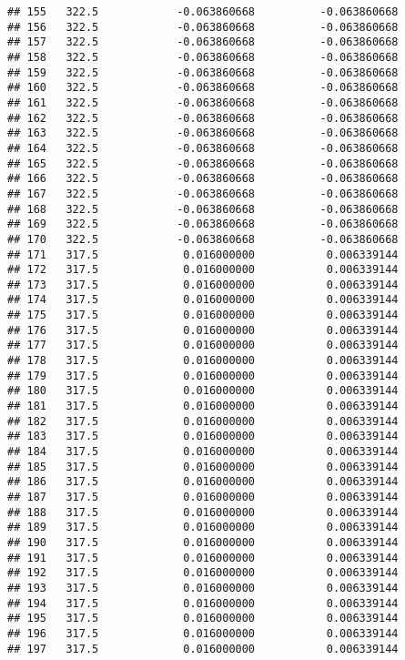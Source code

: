 \documentclass[]{article}
\begin{document}
\begin{verbatim}
## 155   322.5            -0.063860668          -0.063860668
## 156   322.5            -0.063860668          -0.063860668
## 157   322.5            -0.063860668          -0.063860668
## 158   322.5            -0.063860668          -0.063860668
## 159   322.5            -0.063860668          -0.063860668
## 160   322.5            -0.063860668          -0.063860668
## 161   322.5            -0.063860668          -0.063860668
## 162   322.5            -0.063860668          -0.063860668
## 163   322.5            -0.063860668          -0.063860668
## 164   322.5            -0.063860668          -0.063860668
## 165   322.5            -0.063860668          -0.063860668
## 166   322.5            -0.063860668          -0.063860668
## 167   322.5            -0.063860668          -0.063860668
## 168   322.5            -0.063860668          -0.063860668
## 169   322.5            -0.063860668          -0.063860668
## 170   322.5            -0.063860668          -0.063860668
## 171   317.5             0.016000000           0.006339144
## 172   317.5             0.016000000           0.006339144
## 173   317.5             0.016000000           0.006339144
## 174   317.5             0.016000000           0.006339144
## 175   317.5             0.016000000           0.006339144
## 176   317.5             0.016000000           0.006339144
## 177   317.5             0.016000000           0.006339144
## 178   317.5             0.016000000           0.006339144
## 179   317.5             0.016000000           0.006339144
## 180   317.5             0.016000000           0.006339144
## 181   317.5             0.016000000           0.006339144
## 182   317.5             0.016000000           0.006339144
## 183   317.5             0.016000000           0.006339144
## 184   317.5             0.016000000           0.006339144
## 185   317.5             0.016000000           0.006339144
## 186   317.5             0.016000000           0.006339144
## 187   317.5             0.016000000           0.006339144
## 188   317.5             0.016000000           0.006339144
## 189   317.5             0.016000000           0.006339144
## 190   317.5             0.016000000           0.006339144
## 191   317.5             0.016000000           0.006339144
## 192   317.5             0.016000000           0.006339144
## 193   317.5             0.016000000           0.006339144
## 194   317.5             0.016000000           0.006339144
## 195   317.5             0.016000000           0.006339144
## 196   317.5             0.016000000           0.006339144
## 197   317.5             0.016000000           0.006339144

\end{verbatim}
\end{document}
